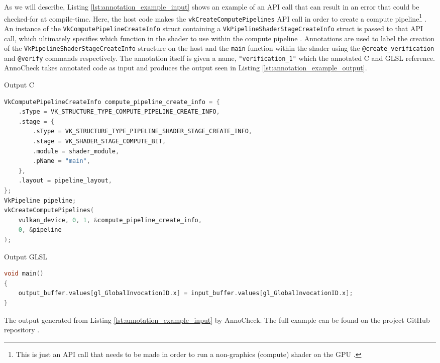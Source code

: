 \documentclass[a4paper,12pt,twoside,openright]{report}
\begin{document}
As we will describe, Listing \ref{lst:annotation_example_input} shows an
example of an API call that can result in an error that could be checked-for at
compile-time. Here, the host code makes the \texttt{vkCreateComputePipelines}
API call in order to create a compute pipeline\footnote{This is just an API
call that needs to be made in order to run a non-graphics (compute) shader on
the GPU \cite{TODO}.} \cite{vkCreateComputePipelines}. An instance of the
\texttt{VkComputePipelineCreateInfo} struct containing a
\texttt{VkPipelineShaderStageCreateInfo} struct is passed to that API call,
which ultimately specifies which function in the shader to use within the
compute pipeline \cite{VkComputePipelineCreateInfo}
\cite{VkPipelineShaderStageCreateInfo}. Annotations are used to label the
creation of the \texttt{VkPipelineShaderStageCreateInfo} structure on the host
and the \texttt{main} function within the shader using the
\texttt{@create\_verification} and \texttt{@verify} commands respectively. The
annotation itself is given a name, \texttt{"verification\_1"} which the
annotated C and GLSL reference. AnnoCheck takes annotated code as input and
produces the output seen in Listing \ref{lst:annotation_example_output}.

\begin{lstfloat}
\begin{center} Output C \end{center}
\begin{lstlisting}[language=C]
VkComputePipelineCreateInfo compute_pipeline_create_info = {
    .sType = VK_STRUCTURE_TYPE_COMPUTE_PIPELINE_CREATE_INFO,
    .stage = {
        .sType = VK_STRUCTURE_TYPE_PIPELINE_SHADER_STAGE_CREATE_INFO,
        .stage = VK_SHADER_STAGE_COMPUTE_BIT,
        .module = shader_module,
        .pName = "main",
    },
    .layout = pipeline_layout,
};
VkPipeline pipeline;
vkCreateComputePipelines(
    vulkan_device, 0, 1, &compute_pipeline_create_info,
    0, &pipeline
);
\end{lstlisting}
\begin{center} Output GLSL \end{center}
\begin{lstlisting}[language=C]
void main()
{
    output_buffer.values[gl_GlobalInvocationID.x] = input_buffer.values[gl_GlobalInvocationID.x];
}
\end{lstlisting}
\caption{The output generated from Listing \ref{lst:annotation_example_input}
by AnnoCheck. The full example can be found on the project GitHub repository
\cite{ProjectSource}.}
\label{lst:annotation_example_output}
\end{lstfloat}
\end{document}
